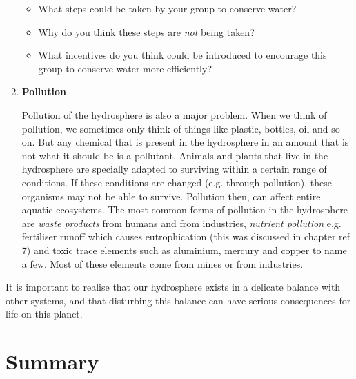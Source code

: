 \begin{enumerate}
{\begin{itemize}
\item{What steps could be taken by your group to conserve water?}
\item{Why do you think these steps are \textit{not} being taken?}
\item{What incentives do you think could be introduced to encourage this group to conserve water more efficiently?}
\end{itemize}
}

\item{\textbf{Pollution}

Pollution of the hydrosphere is also a major problem. When we think of pollution, we sometimes only think of things like plastic, bottles, oil and so on. But any chemical that is present in the hydrosphere in an amount that is not what it should be is a pollutant. Animals and plants that live in the hydrosphere are specially adapted to surviving within a certain range of conditions. If these conditions are changed (e.g. through pollution), these organisms may not be able to survive. Pollution then, can affect entire aquatic ecosystems. The most common forms of pollution in the hydrosphere are \textit{waste products} from humans and from industries, \textit{nutrient pollution} e.g. fertiliser runoff which causes eutrophication (this was discussed in chapter ref {7}) and toxic trace elements such as aluminium, mercury and copper to name a few. Most of these elements come from mines or from industries.}
\end{enumerate} 

It is important to realise that our hydrosphere exists in a delicate balance with other systems, and that disturbing this balance can have serious consequences for life on this planet.



\section{Summary}

